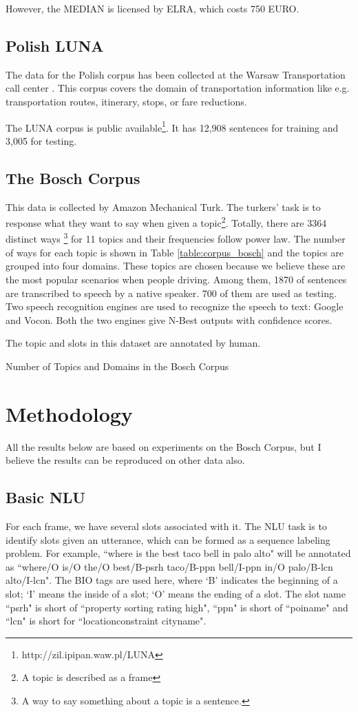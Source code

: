 \documentclass[11pt,letterpaper]{article}
\begin{document}
However, the MEDIAN is licensed by ELRA, which costs 750 EURO.

\subsection{Polish LUNA}
The data for the Polish corpus has been collected at the Warsaw Transportation call center \cite{Marasek:2008}. This corpus covers the domain of transportation information like e.g.  transportation routes, itinerary, stops, or fare reductions.

The LUNA corpus is public available\footnote{http://zil.ipipan.waw.pl/LUNA}. It has 12,908 sentences for training and 3,005 for testing.

\subsection{The Bosch Corpus}
This data is collected by Amazon Mechanical Turk. %
The turkers’ task is to response what they want to say when given a topic\footnote{A topic is described as a frame}. Totally, there are 3364 distinct ways \footnote{A way to say something about a topic is a sentence.} for 11 topics and their frequencies follow power law. The number of ways for each topic is shown in Table \ref{table:corpus_bosch} and the topics are grouped into four domains. These topics are chosen because we believe these are the most popular scenarios when people driving.
Among them, 1870 of sentences are transcribed to speech by a native speaker. 700 of them are used as testing. Two speech recognition engines are used to recognize the speech to text: Google and Vocon. Both the two engines give N-Best outputs with confidence scores.

The topic and slots in this dataset are annotated by human. 

\begin{table}[!htb] 
\centering 
 
\caption{Number of Topics and Domains in the Bosch Corpus} 
\label{table:corpus_bosch} 
\end{table} 
 
\section{Methodology}
All the results below are based on experiments on the Bosch Corpus, but I believe the results can be reproduced on other data also.
\subsection{Basic NLU}
For each frame, we have several slots associated with it. The NLU task is to identify slots given an utterance, which can be formed as a sequence labeling problem. For example, ``where is the best taco bell in palo alto" will be annotated as ``where/O is/O the/O best/B-psrh taco/B-ppn bell/I-ppn in/O palo/B-lcn alto/I-lcn". The BIO tags are used here, where `B' indicates the beginning of a slot; `I' means the inside of a slot; `O' means the ending of a slot. The slot name ``psrh" is short of ``property sorting rating high", ``ppn" is short of ``poiname" and ``lcn" is short for ``locationconstraint cityname".
\end{document}
